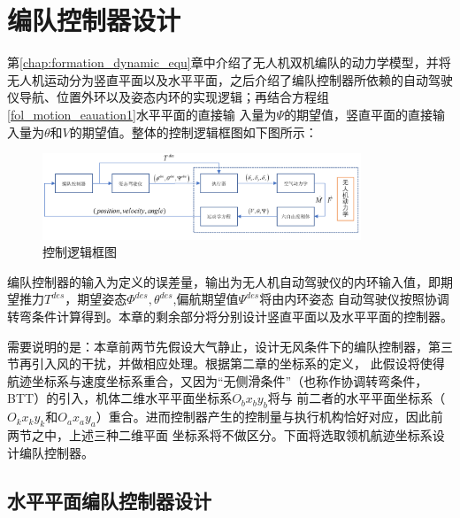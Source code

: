 \chapter{编队控制器设计}
\label{chap:controller_design}
第\ref{chap:formation_dynamic_equ}章中介绍了无人机双机编队的动力学模型，并将无人机运动分为竖直平面以及水平平面，之后介绍了编队控制器所依赖的自动驾驶仪导航、位置外环以及姿态内环的实现逻辑；再结合方程组\ref{fol_motion_eauation1}水平平面的直接输
入量为$\Psi$的期望值，竖直平面的直接输入量为$\theta$和$V$的期望值。整体的控制逻辑框图如下图所示：
\begin{figure}[H]
    \centering
    \includegraphics[width=0.85\textwidth]{figures/c3/c3-overview_controller.png}
    \caption{控制逻辑框图}\label{fig:c3-overview_controller}
\end{figure}
编队控制器的输入为定义的误差量，输出为无人机自动驾驶仪的内环输入值，即期望推力$T^{des}$，期望姿态$\Phi^{des},\theta^{des}$,偏航期望值$\Psi^{des}$将由内环姿态
自动驾驶仪按照协调转弯条件计算得到。本章的剩余部分将分别设计竖直平面以及水平平面的控制器。

需要说明的是：本章前两节先假设大气静止，设计无风条件下的编队控制器，第三节再引入风的干扰，并做相应处理。根据第二章的坐标系的定义，
此假设将使得航迹坐标系与速度坐标系重合，又因为“无侧滑条件”（也称作协调转弯条件，BTT）的引入，机体二维水平平面坐标系$O_bx_by_b$将与
前二者的水平平面坐标系（$O_kx_ky_k$和$O_ax_ay_a$）重合。进而控制器产生的控制量与执行机构恰好对应，因此前两节之中，上述三种二维平面
坐标系将不做区分。下面将选取领机航迹坐标系设计编队控制器。
\section{水平平面编队控制器设计}

